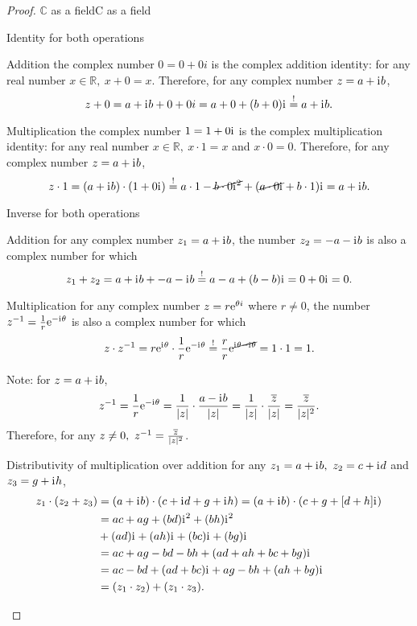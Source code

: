 \begin{proof}{$\bm{\mathbb{C}}$ as a field}{C as a field}
\begin{descitemize}
		\item[Identity for both operations]~\\
			\begin{listitemize}
			\item[Addition] the complex number $0=0+0i$ is the complex addition identity: for any real number $x\in\mathbb{R},\ x+0=x$. Therefore, for any complex number $z=a+\mathrm{i}\mkern1mu b$,
				\[
					z+0 = a+\mathrm{i}\mkern1mu b + 0+0i = a+0 + (b+0)\mathrm{i}\mkern1mu \overset{!}{=} a+\mathrm{i}\mkern1mu b.
				\]
			\item[Multiplication] the complex number $1=1+0\mathrm{i}\mkern1mu$ is the complex multiplication identity: for any real number $x\in\mathbb{R},\ x\cdot1=x$ and $x\cdot0=0$. Therefore, for any complex number $z=a+\mathrm{i}\mkern1mu b$,
				\[
					z\cdot1 = (a+\mathrm{i}\mkern1mu b)\cdot(1+0\mathrm{i}\mkern1mu) \overset{!}{=}a\cdot1-\cancel{b\cdot0\mathrm{i}\mkern1mu^{2}} + (\cancel{a\cdot0\mathrm{i}\mkern1mu}+b\cdot1)\mathrm{i}\mkern1mu = a+\mathrm{i}\mkern1mu b.
				\]

			\end{listitemize}
		
		\item[Inverse for both operations]~\\
			\begin{listitemize}
			\item[Addition] for any complex number $z_{1}=a+\mathrm{i}\mkern1mu b$, the number $z_{2}=-a-\mathrm{i}\mkern1mu b$ is also a complex number for which
				\[
					z_{1} + z_{2} = a+\mathrm{i}\mkern1mu b + -a-\mathrm{i}\mkern1mu b \overset{!}{=} a-a + (b-b)\mathrm{i}\mkern1mu = 0 + 0\mathrm{i}\mkern1mu = 0.
				\]
			\item[Multiplication] for any complex number $z=r\mathrm{e}^{\theta i}$ where $r\neq0$, the number $z^{-1}=\frac{1}{r}\mathrm{e}^{-\mathrm{i}\mkern1mu\theta}$ is also a complex number for which
				\[
					z \cdot z^{-1} = r\mathrm{e}^{\mathrm{i}\mkern1mu\theta} \cdot \frac{1}{r}\mathrm{e}^{-\mathrm{i}\mkern1mu\theta} \overset{!}{=} \frac{r}{r}\mathrm{e}^{\cancel{\mathrm{i}\mkern1mu\theta - \mathrm{i}\mkern1mu\theta}} = 1\cdot1 = 1.
				\]
				
			Note: for $z=a+\mathrm{i}\mkern1mu b$,
			\[
				z^{-1} = \frac{1}{r}\mathrm{e}^{-\mathrm{i}\mkern1mu\theta} = \frac{1}{|z|}\cdot\frac{a-\mathrm{i}\mkern1mu b}{|z|} = \frac{1}{|z|}\cdot\frac{\overline{z}}{|z|} = \frac{\overline{z}}{|z|^{2}}.
			\]
			Therefore, for any $z\neq0,\ z^{-1} = \frac{\overline{z}}{|z|^{2}}$.
			\end{listitemize}

		\item[Distributivity of multiplication over addition] for any $z_{1}=a+\mathrm{i}\mkern1mu b,\ z_{2}=c+\mathrm{i}\mkern1mu d$ and $z_{3}=g+\mathrm{i}\mkern1mu h$,
			\begin{align*}
				z_{1}\cdot(z_{2}+z_{3}) &= (a+\mathrm{i}\mkern1mu b)\cdot(c+\mathrm{i}\mkern1mu d + g+\mathrm{i}\mkern1mu h) = (a+\mathrm{i}\mkern1mu b)\cdot(c+g + [d+h]\mathrm{i}\mkern1mu)\\
				&= ac + ag + (bd)\mathrm{i}\mkern1mu^{2} + (bh)\mathrm{i}\mkern1mu^{2}\\
				&+ (ad)\mathrm{i}\mkern1mu + (ah)\mathrm{i}\mkern1mu + (bc)\mathrm{i}\mkern1mu + (bg)\mathrm{i}\mkern1mu\\
				&= ac + ag - bd - bh + (ad + ah + bc + bg)\mathrm{i}\mkern1mu\\
				&= ac-bd + (ad+bc)\mathrm{i}\mkern1mu + ag-bh + (ah+bg)\mathrm{i}\mkern1mu\\
				&= (z_{1}\cdot z_{2}) + (z_{1}\cdot z_{3}).
			\end{align*}
	\end{descitemize}
\end{proof}

